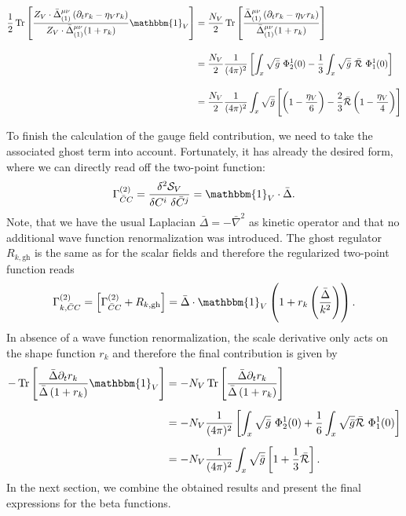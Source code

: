 \begin{align}
	\frac{1}{2}\tr{\frac{Z_V\cdot\bar{\Delta}^{\mu\nu}_{(1)}\left(\partial_t r_k - \eta_Vr_k\right)}{Z_V\cdot\bar{\Delta}^{\mu\nu}_{(1)}(1+r_k)}\mathbbm{1}_V} &= \frac{N_V}{2}\tr{\frac{\bar{\Delta}^{\mu\nu}_{(1)}\left(\partial_t r_k - \eta_Vr_k\right)}{\bar{\Delta}^{\mu\nu}_{(1)}(1+r_k)}}\nonumber \\[10pt]
	&= \frac{N_V}{2}\frac{1}{(4\pi)^2}\left[\int_x\sqrt{\bar{g}}\ \Phi_2^1(0) - \frac{1}{3}\int_x\sqrt{\bar{g}}\  \bar{\mathcal{R}} \  \Phi_1^1(0) \right] \\[10pt]
	&=  \frac{N_V}{2}\frac{1}{(4\pi)^2}\int_x\sqrt{\bar{g}}\left[\left(1-\frac{\eta_V}{6}\right)- \frac{2}{3}\bar{\mathcal{R}}\left(1-\frac{\eta_V}{4}\right)\right]\nonumber
\end{align}


To finish the calculation of the gauge field contribution, we need to take the associated ghost term into account. Fortunately, it has already the desired form, where we can directly read off the two-point function:
\begin{equation}
	\Gamma^{(2)}_{\bar{C}C} = \frac{\delta^2 \mathcal{S}_V}{\delta C^{i}\ \delta \bar{C}^{j}} = \mathbbm{1}_V\cdot\bar{\Delta}.
\end{equation} 
Note, that we have the usual Laplacian $\bar{\Delta} = -\bar{\nabla}^2$ as kinetic operator and that no additional wave function renormalization was introduced. The ghost regulator $R_{k, \mathrm{gh}}$ is the same as for the scalar fields and therefore the regularized two-point function reads
\begin{equation}
		\Gamma^{(2)}_{k, \bar{C}C} = \left[\Gamma^{(2)}_{ \bar{C}C}+ R_{k, \mathrm{gh}}\right]  = \bar{\Delta}\cdot\mathbbm{1}_V\left(1 + r_k\left(\frac{\bar{\Delta}}{k^2}\right)\right).
\end{equation} 
In absence of a wave function renormalization, the scale derivative only acts on the shape function $r_k$ and  therefore the final contribution is given by 
\begin{equation}
\begin{aligned}
	-\tr{\frac{\bar{\Delta}\partial_tr_k}{\bar{\Delta}\left(1+r_k\right)}\mathbbm{1}_V} &= -N_{V}\tr{\frac{\bar{\Delta}\partial_tr_k}{\bar{\Delta}\left(1+r_k\right)}} \\[5pt]
	&= -N_V\frac{1}{(4\pi)^2}\left[\int_x\sqrt{\bar{g}} \ \Phi_2^1(0) + \frac{1}{6}\int_x\sqrt{\bar{g}} \bar{\mathcal{R}} \ \Phi_1^1(0) \right] \\[5pt]
	&= -N_V\frac{1}{(4\pi)^2}\int_x\sqrt{\bar{g}}\left[1 + \frac{1}{3}\bar{\mathcal{R}}\right].	
\end{aligned}
\end{equation}  
In the next section, we combine the obtained results and present the final expressions for the beta functions.
 
